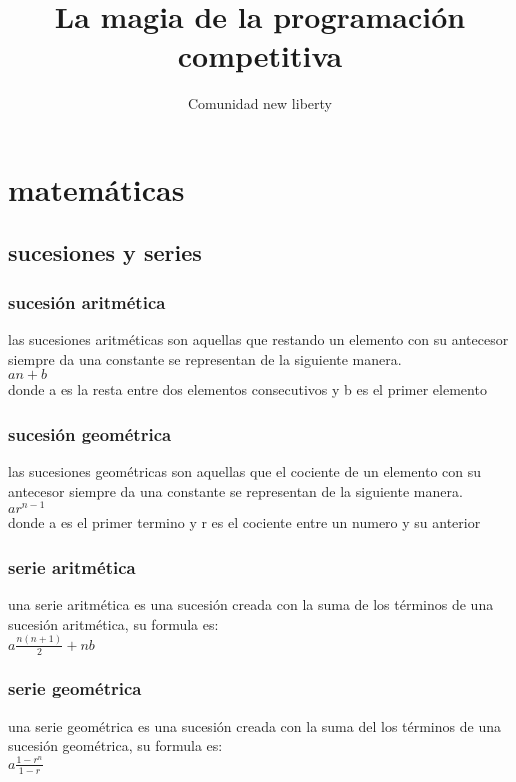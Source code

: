 \documentclass[11pt,a4paper]{book}
\author{Comunidad new liberty}
\title{La magia de la programación competitiva}
\begin{document}
\maketitle
\tableofcontents
\cleardoublepage
{} 
\listoffigures
\cleardoublepage
{}
\listoftables
\cleardoublepage
\chapter{matemáticas}
\section{sucesiones y series}
\subsection{sucesión aritmética}
las sucesiones aritméticas son aquellas que restando un elemento con su antecesor siempre da una constante se representan de la siguiente manera.
\\$ an+b$
\\donde a es la resta entre dos elementos consecutivos y b es el primer elemento

\subsection{sucesión geométrica}
las sucesiones geométricas son aquellas que el cociente de un elemento con su antecesor siempre da una constante se representan de la siguiente manera.
\\$ ar^{n-1}$
\\donde a es el primer termino y r es el cociente entre un numero y su anterior

\subsection{serie aritmética}
una serie aritmética es una sucesión creada con la suma de los términos de una sucesión aritmética, su formula es:
\\$a\frac{n(n+1)}{2}+nb$ 

\subsection{serie geométrica}
una serie geométrica es una sucesión creada con la suma del los términos de una sucesión geométrica, su formula es:
\\$a\frac{1-r^{n}}{1-r}$
\end{document}
